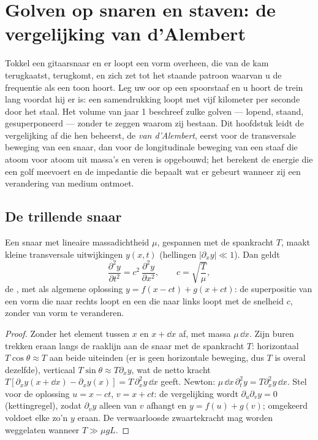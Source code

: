 \chapter{Golven op snaren en staven: de vergelijking van
d'Alembert}\label{ch:b2:waves-on-strings}

Tokkel een gitaarsnaar en er loopt een vorm overheen, die van de kam
terugkaatst, terugkomt, en zich zet tot het staande patroon waarvan u de
frequentie als een toon hoort. Leg uw oor op een spoorstaaf en u hoort de
trein lang voordat hij er is: een samendrukking loopt met vijf kilometer per
seconde door het staal. Het volume van jaar 1 beschreef zulke golven ---
lopend, staand, gesuperponeerd --- zonder te zeggen waarom zij bestaan. Dit
hoofdstuk leidt de vergelijking af die hen beheerst, de
\emph{ van d'Alembert}, eerst voor de transversale beweging
van een snaar, dan voor de longitudinale beweging van een staaf die atoom
voor atoom uit massa's en veren is opgebouwd; het berekent de energie die
een golf meevoert en de impedantie die bepaalt wat er gebeurt wanneer zij
een verandering van medium ontmoet.

\section{De trillende snaar}

\begin{theorem}\label{thm:b2:waves-on-strings:equation}
Een snaar met lineaire massadichtheid $\mu$, gespannen met de spankracht
$T$, maakt kleine transversale uitwijkingen $y(x, t)$ (hellingen
$|\partial_xy| \ll 1$). Dan geldt
\[
\frac{\partial^2y}{\partial t^2} = c^2\,\frac{\partial^2y}{\partial x^2} ,
\qquad c = \sqrt{\frac{T}{\mu}} ,
\]
de \emph{}, met als algemene oplossing
$y = f(x - ct)
+ g(x + ct)$: de superpositie van een vorm die naar rechts
loopt en een die naar links loopt met de snelheid $c$, zonder van vorm te
veranderen.
\end{theorem}

\begin{proof}
Zonder het element tussen $x$ en $x + \dd x$ af, met massa $\mu\,\dd x$.
Zijn buren trekken eraan langs de raaklijn aan de snaar met de spankracht
$T$: horizontaal $T\cos\theta \approx T$ aan beide uiteinden (er is geen
horizontale beweging, dus $T$ is overal dezelfde), verticaal
$T\sin\theta \approx T\partial_xy$, wat de netto kracht
$T[\partial_xy(x + \dd x) - \partial_xy(x)] = T\,\partial_x^2y\,\dd x$
geeft. Newton: $\mu\,\dd x\,\partial_t^2y = T\partial_x^2y\,\dd x$. Stel
voor de oplossing $u = x - ct$, $v = x + ct$: de vergelijking wordt
$\partial_u\partial_vy = 0$ (kettingregel), zodat $\partial_vy$ alleen van
$v$ afhangt en $y = f(u) + g(v)$; omgekeerd voldoet elke zo'n $y$ eraan. De
verwaarloosde zwaartekracht mag worden weggelaten wanneer $T \gg \mu gL$.
\end{proof}

